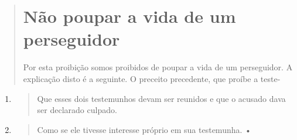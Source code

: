 \begin{quote}
\section{Não poupar a vida de um perseguidor}

Por esta proibição somos proibidos de poupar a vida de um perse­guidor.
A explicação disto é a seguinte. O preceito precedente, que proíbe a
teste-
\end{quote}

\begin{enumerate}
\def\labelenumi{\arabic{enumi}.}
\setcounter{enumi}{417}
\item
 \begin{quote}
 Que esses dois testemunhos devam ser reunidos e que o acusado dava ser
 declarado culpado.
 \end{quote}
\item
 \begin{quote}
 Como se ele tivesse interesse próprio em sua testemunha. •
 \end{quote}
\end{enumerate}

